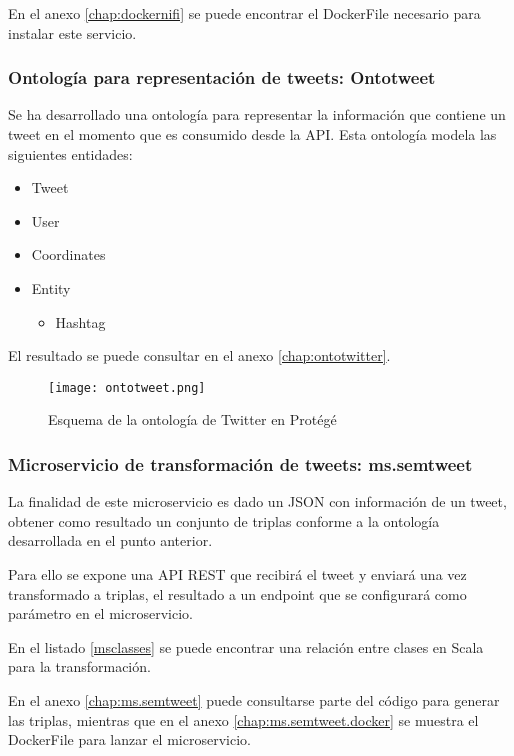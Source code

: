 En el anexo \ref{chap:dockernifi} se puede encontrar el DockerFile necesario
para instalar este servicio. 

\subsubsection{Ontología para representación de tweets: Ontotweet}

Se ha desarrollado una ontología para representar la información que contiene un
tweet en el momento que es consumido desde la \acs{API}. Esta ontología modela
las siguientes entidades: 

\begin{itemize}
\item Tweet
\item User
\item Coordinates
\item Entity
  \begin{itemize}
  \item Hashtag
  \end{itemize}
\end{itemize}

El resultado se puede consultar en el anexo \ref{chap:ontotwitter}.

\begin{figure}[!h]
  \begin{center}
    \texttt{[image: ontotweet.png]} 
    \caption{Esquema de la ontología de Twitter en Protégé}
    \label{fig:ontotwitterprotege}
  \end{center}
\end{figure}

\subsubsection{Microservicio de transformación de tweets: ms.semtweet}

La finalidad de este microservicio es dado un \acs{JSON} con información de un
tweet, obtener como resultado un conjunto de triplas conforme a la ontología
desarrollada en el punto anterior.

Para ello se expone una \acs{API} \acs{REST} que recibirá el tweet y enviará una
vez transformado a triplas, el resultado a un endpoint que se configurará como
parámetro en el microservicio. 

En el listado \ref{msclasses} se puede encontrar una relación entre clases en
Scala para la transformación. 

En el anexo \ref{chap:ms.semtweet} puede consultarse parte del código para
generar las triplas, mientras que en el anexo \ref{chap:ms.semtweet.docker} se muestra el DockerFile para lanzar el
microservicio. 

